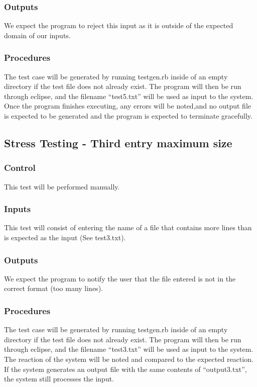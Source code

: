 \documentclass[]{article}
\begin{document}
	\subsubsection{Outputs}
	We expect the program to reject this input as it is outside of the expected
	domain of our inputs.
	
	\subsubsection{Procedures}
	The test case will be generated by running testgen.rb inside of an empty
	directory if the test file does not already exist.  The program will then be
	run through eclipse, and the filename ``test5.txt'' will be used as input to
	the system.  Once the program finishes executing, any errors will be noted,and 
	no output file is expected to be generated and the program is expected to
	terminate gracefully.
	

\subsection{Stress Testing - Third entry maximum size}
	\subsubsection{Control}
	This test will be performed manually.
	
	\subsubsection{Inputs}
	This test will consist of entering the name of a file that contains more lines
	than is expected as the input (See test3.txt).
	
	\subsubsection{Outputs}
	We expect the program to notify the user that the file entered is not in the
	correct format (too many lines).
	
	\subsubsection{Procedures}
	The test case will be generated by running testgen.rb inside of an empty
	directory if the test file does not already exist.  The program will then be
	run through eclipse, and the filename ``test3.txt'' will be used as input to
	the system.  The reaction of the system will be noted and compared to the
	expected reaction.  If the system generates an output file with the same
	contents of ``output3.txt'', the system still processes the input.  
	
\end{document}

